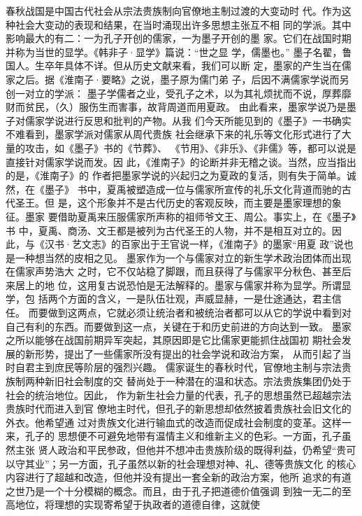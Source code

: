\documentclass[12pt,UTF8]{ctexbook}
\begin{document}
春秋战国是中国古代社会从宗法贵族制向官僚地主制过渡的大变动时 
代。作为这种社会大变动的表现和结果，在当时涌现出许多思想主张互不相 
同的学派。其中影响最大的有二：一为孔子开创的儒家，一为墨子开创的墨 
家。它们在战国时期并称为当世的显学。《韩非子·显学》篇说：“世之显 
学，儒墨也。” 
墨子名翟，鲁国人。生卒年具体不详。但从历史文献来看，我们可以断 
定，墨家的产生当在儒家之后。据《淮南子·要略》之说，墨子原为儒门弟 
子，后因不满儒家学说而另创一对立的学派： 
墨子学儒者之业，受孔子之术，以为其礼烦扰而不说，厚葬靡 
财而贫民，（久）服伤生而害事，故背周道而用夏政。 
由此看来，墨家学说乃是墨子对儒家学说进行反思和批判的产物。从我 
们今天所能见到的《墨子》一书确实不难看到，墨家学派对儒家从周代贵族 
社会继承下来的礼乐等文化形式进行了大量的攻击，如《墨子》书的《节葬》、 
《节用》、《非乐》、《非儒》等，都可以说是直接针对儒家学说而发。因 
此，《淮南子》的论断并非无稽之谈。当然，应当指出的是，《淮南子》的 
作者把墨家学说的兴起归之为夏政的复活，则有失于简单。诚然，在《墨子》 
书中，夏禹被塑造成一位与儒家所宣传的礼乐文化背道而驰的古代圣王。但 
是，这个形象并不是古代历史的客观反映，而主要是墨家理想的象征。墨家 
要借助夏禹来压服儒家所声称的祖师爷文王、周公。事实上，在《墨子》书 
中，夏禹、商汤、文王都是被列为古代圣王的人物，并不是相互对立的。因 
此，与《汉书·艺文志》的百家出于王官说一样，《淮南子》的墨家“用夏 
政”说也是一种想当然的皮相之见。 
墨家作为一个与儒家对立的新生学术政治团体而出现在儒家声势浩大 
之时，它不仅站稳了脚跟，而且获得了与儒家平分秋色、甚至后来居上的地 
位，这用复古说恐怕是无法解释的。墨家与儒家并称为显学。所谓显学，包 
括两个方面的含义，一是队伍壮观，声威显赫，一是仕途通达，君主信任。 
而要做到这两点，它就必须让统治者和被统治者都可以从它的学说中看到对 
自己有利的东西。而要做到这一点，关键在于和历史前进的方向达到一致。 
墨家之所以能够在战国前期异军突起，其原因即是它比儒家更能抓住战国初 
期社会发展的新形势，提出了一些儒家所没有提出的社会学说和政治方案， 
从而引起了当时自君主到庶民等阶层的强烈兴趣。 
儒家诞生的春秋时代，官僚地主制与宗法贵族制两种新旧社会制度的交 
替尚处于一种潜在的温和状态。宗法贵族集团仍处于社会的统治地位。因此， 
作为新生社会力量的代表，孔子的思想虽然已超越宗法贵族时代而进入到官 
僚地主时代，但孔子的新思想却依然披着贵族社会旧文化的外衣。他希望通 
过对贵族文化进行输血式的改造而促成社会制度的变革。这样一来，孔子的 
思想便不可避免地带有温情主义和维新主义的色彩。一方面，孔子虽然主张 
贤人政治和平民参政，但他并不想冲击贵族阶级的既得利益，仍希望“贵可 
以守其业”；另一方面，孔子虽然以新的社会理想对神、礼、德等贵族文化 
的核心内容进行了超越和改造，但他并没有提出一套全新的政治方案，他所 
追求的有道之世乃是一个十分模糊的概念。而且，由于孔子把道德价值强调 
到独一无二的至高地位，将理想的实现寄希望于执政者的道德自律，这就使 
\end{document}
